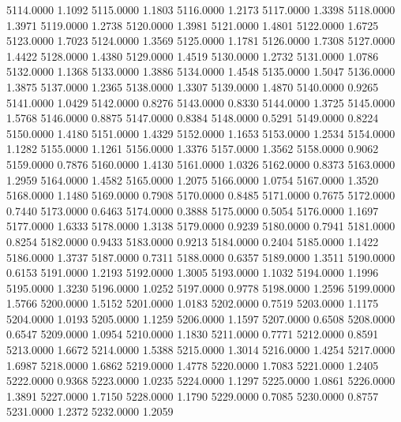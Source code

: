 5114.0000      1.1092
5115.0000      1.1803
5116.0000      1.2173
5117.0000      1.3398
5118.0000      1.3971
5119.0000      1.2738
5120.0000      1.3981
5121.0000      1.4801
5122.0000      1.6725
5123.0000      1.7023
5124.0000      1.3569
5125.0000      1.1781
5126.0000      1.7308
5127.0000      1.4422
5128.0000      1.4380
5129.0000      1.4519
5130.0000      1.2732
5131.0000      1.0786
5132.0000      1.1368
5133.0000      1.3886
5134.0000      1.4548
5135.0000      1.5047
5136.0000      1.3875
5137.0000      1.2365
5138.0000      1.3307
5139.0000      1.4870
5140.0000      0.9265
5141.0000      1.0429
5142.0000      0.8276
5143.0000      0.8330
5144.0000      1.3725
5145.0000      1.5768
5146.0000      0.8875
5147.0000      0.8384
5148.0000      0.5291
5149.0000      0.8224
5150.0000      1.4180
5151.0000      1.4329
5152.0000      1.1653
5153.0000      1.2534
5154.0000      1.1282
5155.0000      1.1261
5156.0000      1.3376
5157.0000      1.3562
5158.0000      0.9062
5159.0000      0.7876
5160.0000      1.4130
5161.0000      1.0326
5162.0000      0.8373
5163.0000      1.2959
5164.0000      1.4582
5165.0000      1.2075
5166.0000      1.0754
5167.0000      1.3520
5168.0000      1.1480
5169.0000      0.7908
5170.0000      0.8485
5171.0000      0.7675
5172.0000      0.7440
5173.0000      0.6463
5174.0000      0.3888
5175.0000      0.5054
5176.0000      1.1697
5177.0000      1.6333
5178.0000      1.3138
5179.0000      0.9239
5180.0000      0.7941
5181.0000      0.8254
5182.0000      0.9433
5183.0000      0.9213
5184.0000      0.2404
5185.0000      1.1422
5186.0000      1.3737
5187.0000      0.7311
5188.0000      0.6357
5189.0000      1.3511
5190.0000      0.6153
5191.0000      1.2193
5192.0000      1.3005
5193.0000      1.1032
5194.0000      1.1996
5195.0000      1.3230
5196.0000      1.0252
5197.0000      0.9778
5198.0000      1.2596
5199.0000      1.5766
5200.0000      1.5152
5201.0000      1.0183
5202.0000      0.7519
5203.0000      1.1175
5204.0000      1.0193
5205.0000      1.1259
5206.0000      1.1597
5207.0000      0.6508
5208.0000      0.6547
5209.0000      1.0954
5210.0000      1.1830
5211.0000      0.7771
5212.0000      0.8591
5213.0000      1.6672
5214.0000      1.5388
5215.0000      1.3014
5216.0000      1.4254
5217.0000      1.6987
5218.0000      1.6862
5219.0000      1.4778
5220.0000      1.7083
5221.0000      1.2405
5222.0000      0.9368
5223.0000      1.0235
5224.0000      1.1297
5225.0000      1.0861
5226.0000      1.3891
5227.0000      1.7150
5228.0000      1.1790
5229.0000      0.7085
5230.0000      0.8757
5231.0000      1.2372
5232.0000      1.2059
